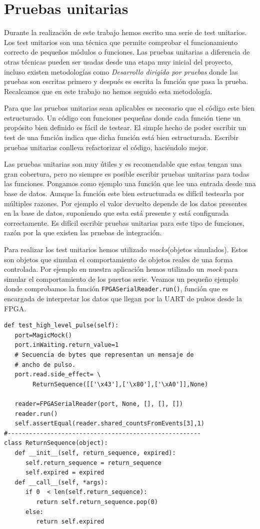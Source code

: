 \section{Pruebas unitarias}
	Durante la realización de este trabajo hemos escrito una serie de test unitarios\cite{UnitTest}. Los test unitarios son una técnica que
	permite comprobar el funcionamiento correcto de pequeños módulos o funciones. Las pruebas unitarias a diferencia de otras técnicas pueden ser
	usadas desde una etapa muy inicial del proyecto, incluso existen metodologías como \emph{Desarrollo dirigido por pruebas} donde las pruebas
	son escritas primero y después es escrita la función que pasa la prueba. Recalcamos que en este trabajo no hemos seguido esta metodología.
	\par
	Para que las pruebas unitarias sean aplicables es necesario que el código este bien estructurado. Un código con funciones pequeñas donde cada
	función tiene un propósito bien definido es fácil de testear. El simple hecho de poder escribir un test de una función indica que dicha
	función está bien estructurada. Escribir pruebas unitarias conlleva refactorizar el código, haciéndolo mejor.
	\par
	Las pruebas unitarias son muy útiles y es recomendable que estas tengan una gran cobertura, pero no siempre es posible escribir pruebas
	unitarias para todas las funciones. Pongamos como ejemplo una función que lee una entrada desde una base de datos. Aunque la función este bien
	estructurada es difícil testearla por múltiples razones. Por ejemplo el valor devuelto depende de los datos presentes en la base de datos,
	suponiendo que esta está presente y está configurada correctamente. Es difícil escribir pruebas unitarias para este tipo de funciones, razón
	por la que existen las pruebas de integración.
	\par
	Para realizar los test unitarios hemos utilizado \emph{mocks}(objetos simulados). Estos son objetos que simulan el comportamiento de objetos
	reales de una forma controlada. Por ejemplo en nuestra aplicación hemos utilizado un \emph{mock} para simular el comportamiento de los puertos
	serie. Veamos un pequeño ejemplo donde comprobamos la función \texttt{FPGASerialReader.run()}, función que es encargada de interpretar los
	datos que llegan por la UART de pulsos desde la FPGA.
	\begin{lstlisting}[style=myPython]
def test_high_level_pulse(self):
   port=MagicMock()
   port.inWaiting.return_value=1
   # Secuencia de bytes que representan un mensaje de
   # ancho de pulso.
   port.read.side_effect= \
        ReturnSequence([['\x43'],['\x80'],['\xA0']],None)	

   reader=FPGASerialReader(port, None, [], [], [])
   reader.run()
   self.assertEqual(reader.shared_countsFromEvents[3],1)
#------------------------------------------------------
class ReturnSequence(object):
   def __init__(self, return_sequence, expired):
      self.return_sequence = return_sequence
      self.expired = expired
   def __call__(self, *args):
      if 0  < len(self.return_sequence):
         return self.return_sequence.pop(0)
      else:
         return self.expired
	\end{lstlisting}
